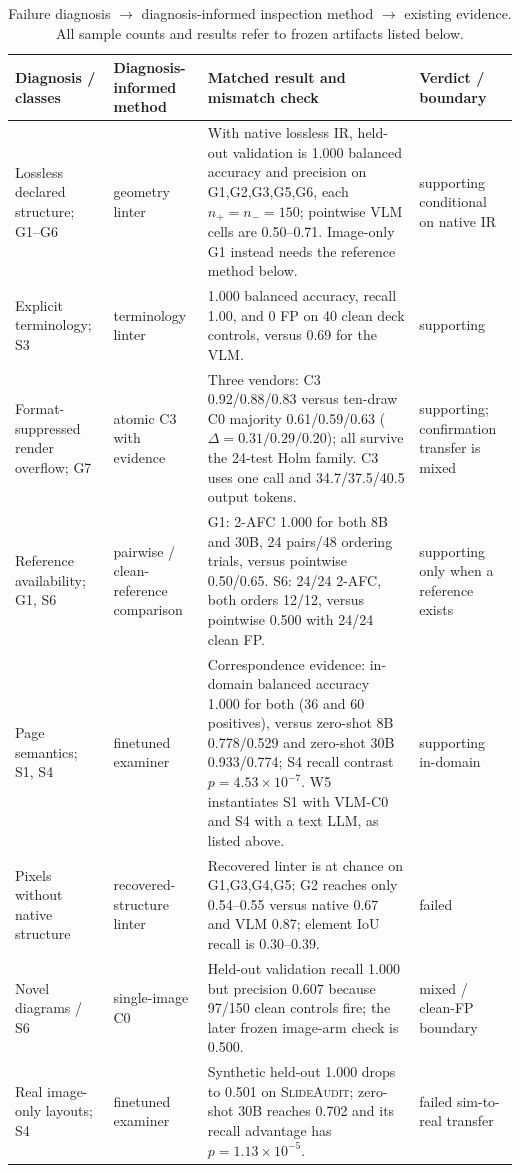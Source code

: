 \documentclass[11pt]{article}
\newcommand{\g}[1]{\textsf{#1}}
\begin{document}
\begin{table}[h]
\centering
\small
\setlength{\tabcolsep}{4pt}
\caption{Failure diagnosis $\rightarrow$ diagnosis-informed inspection method $\rightarrow$ existing evidence.
All sample counts and results refer to frozen artifacts listed below.}
\label{tab:diagnosis-method}
\begin{tabular}{@{}p{}p{}p{}p{}@{}}
\toprule
Diagnosis / classes & Diagnosis-informed method & Matched result and mismatch check & Verdict / boundary \\
\midrule
Lossless declared structure; \g{G1--G6} & geometry linter & With native lossless IR, held-out validation is 1.000 balanced accuracy and precision on \g{G1,G2,G3,G5,G6}, each $n_+=n_-=150$; pointwise VLM cells are 0.50--0.71. Image-only \g{G1} instead needs the reference method below. & supporting conditional on native IR \\
Explicit terminology; \g{S3} & terminology linter & 1.000 balanced accuracy, recall 1.00, and 0 FP on 40 clean deck controls, versus 0.69 for the VLM. & supporting \\
Format-suppressed render overflow; \g{G7} & atomic C3 with evidence & Three vendors: C3 0.92/0.88/0.83 versus ten-draw C0 majority 0.61/0.59/0.63 ($\Delta=0.31/0.29/0.20$); all survive the 24-test Holm family. C3 uses one call and 34.7/37.5/40.5 output tokens. & supporting; confirmation transfer is mixed \\
Reference availability; \g{G1}, \g{S6} & pairwise / clean-reference comparison & \g{G1}: 2-AFC 1.000 for both 8B and 30B, 24 pairs/48 ordering trials, versus pointwise 0.50/0.65. \g{S6}: 24/24 2-AFC, both orders 12/12, versus pointwise 0.500 with 24/24 clean FP. & supporting only when a reference exists \\
Page semantics; \g{S1}, \g{S4} & finetuned examiner & Correspondence evidence: in-domain balanced accuracy 1.000 for both (36 and 60 positives), versus zero-shot 8B 0.778/0.529 and zero-shot 30B 0.933/0.774; \g{S4} recall contrast $p=4.53\times10^{-7}$. W5 instantiates \g{S1} with VLM-C0 and \g{S4} with a text LLM, as listed above. & supporting in-domain \\
Pixels without native structure & recovered-structure linter & Recovered linter is at chance on \g{G1,G3,G4,G5}; \g{G2} reaches only 0.54--0.55 versus native 0.67 and VLM 0.87; element IoU recall is 0.30--0.39. & failed \\
Novel diagrams / \g{S6} & single-image C0 & Held-out validation recall 1.000 but precision 0.607 because 97/150 clean controls fire; the later frozen image-arm check is 0.500. & mixed / clean-FP boundary \\
Real image-only layouts; \g{S4} & finetuned examiner & Synthetic held-out 1.000 drops to 0.501 on \textsc{SlideAudit}; zero-shot 30B reaches 0.702 and its recall advantage has $p=1.13\times10^{-5}$. & failed sim-to-real transfer \\
\bottomrule
\end{tabular}
\end{table}
\end{document}
